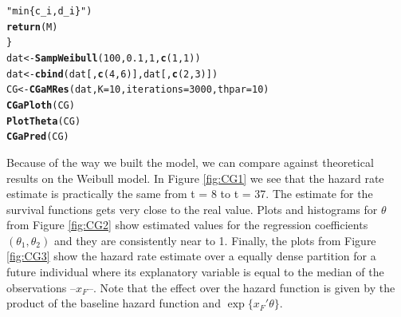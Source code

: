 \documentclass[letterpaper]{article}\usepackage[]{graphicx}\usepackage[]{xcolor}
\makeatletter
\newcommand{\hlnum}[1]{\textcolor[rgb]{0.686,0.059,0.569}{#1}}%
\newcommand{\hlstr}[1]{\textcolor[rgb]{0.192,0.494,0.8}{#1}}%
\newcommand{\hlstd}[1]{\textcolor[rgb]{0.345,0.345,0.345}{#1}}%
\newcommand{\hlkwb}[1]{\textcolor[rgb]{0.69,0.353,0.396}{#1}}%
\newcommand{\hlkwc}[1]{\textcolor[rgb]{0.333,0.667,0.333}{#1}}%
\newcommand{\hlkwd}[1]{\textcolor[rgb]{0.737,0.353,0.396}{\textbf{#1}}}%
\newenvironment{kframe}{%
 \def\at@end@of@kframe{}%
 \ifinner\ifhmode%
  \def\at@end@of@kframe{\end{minipage}}%
  \begin{minipage}{\columnwidth}%
 \fi\fi%
 \def\FrameCommand##1{\hskip\@totalleftmargin \hskip-\fboxsep
 \colorbox{shadecolor}{##1}\hskip-\fboxsep
     \hskip-\linewidth \hskip-\@totalleftmargin \hskip\columnwidth}%
 \MakeFramed {\advance\hsize-\width
   \@totalleftmargin\z@ \linewidth\hsize
   \@setminipage}}%
 {\par\unskip\endMakeFramed%
 \at@end@of@kframe}
\newenvironment{knitrout}{}{} %
\makeatother
\begin{document}
\begin{knitrout}
\begin{kframe}
\begin{alltt}
                   \hlstr{"min\{c_i, d_i\}"}\hlstd{)}
  \hlkwd{return}\hlstd{(M)}
\hlstd{\}}
\hlstd{dat} \hlkwb{<-} \hlkwd{SampWeibull}\hlstd{(}\hlnum{100}\hlstd{,} \hlnum{0.1}\hlstd{,} \hlnum{1}\hlstd{,} \hlkwd{c}\hlstd{(}\hlnum{1}\hlstd{,} \hlnum{1}\hlstd{))}
\hlstd{dat} \hlkwb{<-} \hlkwd{cbind}\hlstd{(dat[,} \hlkwd{c}\hlstd{(}\hlnum{4}\hlstd{,} \hlnum{6}\hlstd{)], dat[,} \hlkwd{c}\hlstd{(}\hlnum{2}\hlstd{,} \hlnum{3}\hlstd{)])}
\hlstd{CG} \hlkwb{<-} \hlkwd{CGaMRes}\hlstd{(dat,} \hlkwc{K} \hlstd{=} \hlnum{10}\hlstd{,} \hlkwc{iterations} \hlstd{=} \hlnum{3000}\hlstd{,} \hlkwc{thpar} \hlstd{=} \hlnum{10}\hlstd{)}
\hlkwd{CGaPloth}\hlstd{(CG)}
\hlkwd{PlotTheta}\hlstd{(CG)}
\hlkwd{CGaPred}\hlstd{(CG)}
\end{alltt}
\end{kframe}
\end{knitrout}

Because of the way we built the model, we can compare against theoretical results on the Weibull model. In Figure \ref{fig:CG1} we see that the hazard rate estimate is practically the same from t = 8 to t = 37. The estimate for the survival functions gets very close to the real value. Plots and histograms for $\theta$ from Figure \ref{fig:CG2} show estimated values for the regression coefficients $(\theta_1,\theta_2)$ and they are consistently near to 1. Finally, the plots from Figure \ref{fig:CG3} show the hazard rate estimate over a equally dense partition for a future individual where its explanatory variable is equal to the median of the observations --$x_F$--. Note that the effect over the hazard function is given by the product of the baseline hazard function and $\exp\{x_F'\theta\}$.
 
\end{document}
